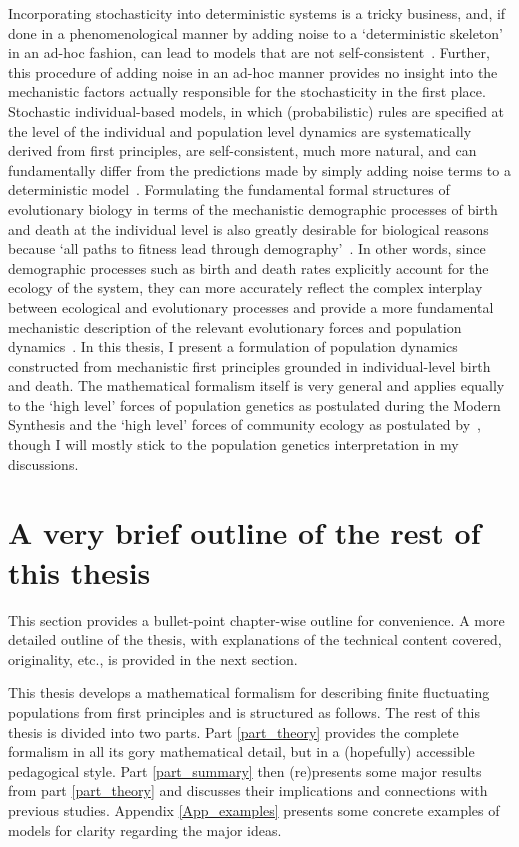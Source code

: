 Incorporating stochasticity into deterministic systems is a tricky business, and, if done in a phenomenological manner by adding noise to a `deterministic skeleton'~\citep{coulson_skeletons_2004} in an ad-hoc fashion, can lead to models that are not self-consistent~\citep{strang_how_2019}. Further, this procedure of adding noise in an ad-hoc manner provides no insight into the mechanistic factors actually responsible for the stochasticity in the first place. Stochastic individual-based models, in which (probabilistic) rules are specified at the level of the individual and population level dynamics are systematically derived from first principles, are self-consistent, much more natural, and can fundamentally differ from the predictions made by simply adding noise terms to a deterministic model~\citep{black_stochastic_2012,strang_how_2019}. Formulating the fundamental formal structures of evolutionary biology in terms of the mechanistic demographic processes of birth and death at the individual level is also greatly desirable for biological reasons~\citep{metcalf_why_2007,geritz_mathematical_2012} because `all paths to fitness lead through demography'~\citep{metcalf_all_2007}. In other words, since demographic processes such as birth and death rates explicitly account for the ecology of the system, they can more accurately reflect the complex interplay between ecological and evolutionary processes and provide a more fundamental mechanistic description of the relevant evolutionary forces and population dynamics~\citep{doebeli_towards_2017}. In this thesis, I present a formulation of population dynamics constructed from mechanistic first principles grounded in individual-level birth and death. The mathematical formalism itself is very general and applies equally to the `high level' forces of population genetics as postulated during the Modern Synthesis and the `high level' forces of community ecology as postulated by~\cite{vellend_theory_2016}, though I will mostly stick to the population genetics interpretation in my discussions.

\section{A very brief outline of the rest of this thesis}
This section provides a bullet-point chapter-wise outline for convenience. A more detailed outline of the thesis, with explanations of the technical content covered, originality, etc., is provided in the next section.

This thesis develops a mathematical formalism for describing finite fluctuating populations from first principles and is structured as follows. The rest of this thesis is divided into two parts. Part \ref{part_theory} provides the complete formalism in all its gory mathematical detail, but in a (hopefully) accessible pedagogical style. Part \ref{part_summary} then (re)presents some major results from part \ref{part_theory} and discusses their implications and connections with previous studies. Appendix \ref{App_examples} presents some concrete examples of models for clarity regarding the major ideas.


